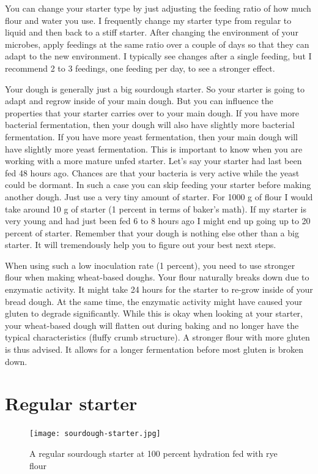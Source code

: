You can change your starter type by just adjusting the feeding ratio of how
much flour and water you use. I frequently change my starter type from
regular to liquid and then back to a stiff starter. After changing the
environment of your microbes, apply feedings at the same ratio over a couple of
days so that they can adapt to the new environment. I typically see
changes after a single feeding, but I recommend 2 to 3 feedings, one feeding per
day, to see a stronger effect.

Your dough is generally just a big sourdough starter. So your starter is going
to adapt and regrow inside of your main dough. But you can influence the
properties that your starter carries over to your main dough. If you have more
bacterial fermentation, then your dough will also have slightly more bacterial
fermentation. If you have more yeast fermentation, then your main dough will
have slightly more yeast fermentation. This is important to know when you are
working with a more mature unfed starter. Let's say your starter had last been
fed 48 hours ago. Chances are that your bacteria is very active while the
yeast could be dormant. In such a case you can skip feeding your starter
before making another dough. Just use a very tiny amount of starter. For 1000 g
of flour I would take around 10 g of starter (1 percent in terms of baker's
math). If my starter is very young and had just been fed 6 to 8 hours ago I might
end up going up to 20 percent of starter. Remember that your dough is nothing
else other than a big starter. It will tremendously help you to figure out
your best next steps.

When using such a low inoculation rate (1 percent), you need to use stronger
flour when making wheat-based doughs. Your flour naturally breaks down due
to enzymatic activity. It might take 24 hours for the starter to re-grow
inside of your bread dough. At the same time, the enzymatic activity might
have caused your gluten to degrade significantly. While this is okay
when looking at your starter, your wheat-based dough will flatten
out during baking and no longer have the typical characteristics (fluffy crumb
structure). A stronger flour with more gluten is thus advised. It allows for
a longer fermentation before most gluten is broken down.

\section{Regular starter}

\begin{figure}[!htb]
  \texttt{[image: sourdough-starter.jpg]}
  \caption{A regular sourdough starter at 100 percent hydration fed with rye flour}
  \label{fig:regular-sourdough-starter}
\end{figure}

